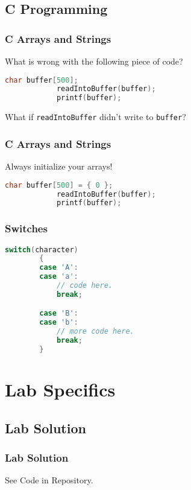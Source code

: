 \documentclass{beamer}
\begin{document}
\subsection{C Programming}
\begin{frame}[fragile]
	\frametitle{C Arrays and Strings}
	What is wrong with the following piece of code?
	\begin{example}
		\begin{lstlisting}[language=C]
			char buffer[500];
			readIntoBuffer(buffer);
			printf(buffer);
		\end{lstlisting} 
	\end{example}
	\pause
	What if \texttt{readIntoBuffer} didn't write to \texttt{buffer}?
\end{frame}
\begin{frame}[fragile]
	\frametitle{C Arrays and Strings}
	Always initialize your arrays!
	\begin{example}
		\begin{lstlisting}[language=C]
			char buffer[500] = { 0 };
			readIntoBuffer(buffer);
			printf(buffer);
		\end{lstlisting}
	\end{example}
\end{frame}

\begin{frame}[fragile]
	\frametitle{Switches}
	\begin{example}
	\begin{lstlisting}[language=C]
		switch(character)
		{
		case 'A':
		case 'a':
			// code here.
			break;

		case 'B':
		case 'b':
			// more code here.
			break;
		}
	\end{lstlisting}
	\end{example}
\end{frame}

\section{Lab Specifics}
\subsection{Lab Solution}
\begin{frame}
	\frametitle{Lab Solution}
	See Code in Repository.
\end{frame}
\end{document}
